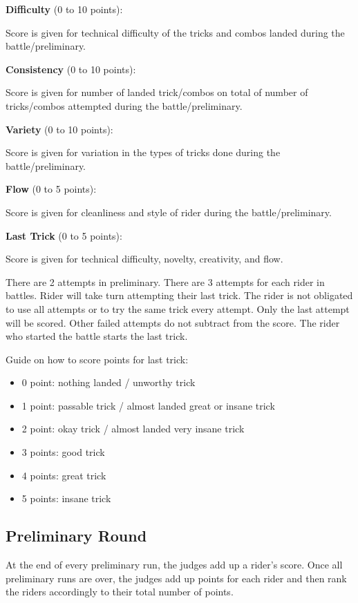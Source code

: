 \textbf{Difficulty} (0 to 10 points):

Score is given for technical difficulty of the tricks and combos landed during the battle/preliminary.

\textbf{Consistency} (0 to 10 points):

Score is given for number of landed trick/combos on total of number of tricks/combos attempted during the battle/preliminary.

\textbf{Variety} (0 to 10 points):

Score is given for variation in the types of tricks done during the battle/preliminary.

\textbf{Flow} (0 to 5 points):

Score is given for cleanliness and style of rider during the battle/preliminary.

\textbf{Last Trick} (0 to 5 points):

Score is given for technical difficulty, novelty, creativity, and flow.

There are 2 attempts in preliminary. 
There are 3 attempts for each rider in battles. Rider will take turn attempting their last trick. The rider is not obligated to use all attempts or to try the same trick every attempt.
Only the last attempt will be scored.
Other failed attempts do not subtract from the score. The rider who started the battle starts the last trick.

Guide on how to score points for last trick:
\begin{itemize}
\item 0 point: nothing landed / unworthy trick
\item 1 point: passable trick / almost landed great or insane trick
\item 2 point: okay trick / almost landed very insane trick
\item 3 points: good trick
\item 4 points: great trick
\item 5 points: insane trick
\end{itemize}

\subsection{Preliminary Round}
At the end of every preliminary run, the judges add up a rider's score.
Once all preliminary runs are over, the judges add up points for each rider and then rank the riders accordingly to their total number of points.


